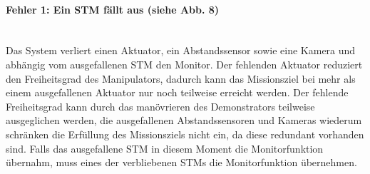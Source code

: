 \paragraph{\textbf{Fehler 1: Ein STM fällt aus (siehe Abb. 8)}}$\;$\\
Das System verliert einen Aktuator, ein Abstandssensor sowie eine Kamera und abhängig vom ausgefallenen STM den Monitor.
Der fehlenden Aktuator reduziert den Freiheitsgrad des Manipulators, dadurch kann das Missionsziel bei mehr als einem ausgefallenen Aktuator nur noch teilweise erreicht werden. Der fehlende Freiheitsgrad kann durch das manövrieren des Demonstrators teilweise ausgeglichen werden, die ausgefallenen Abstandssensoren und Kameras wiederum schränken die Erfüllung des Missionsziels nicht ein, da diese redundant vorhanden sind.
Falls das ausgefallene STM in diesem Moment die Monitorfunktion übernahm, muss eines der verbliebenen STMs die Monitorfunktion übernehmen.

